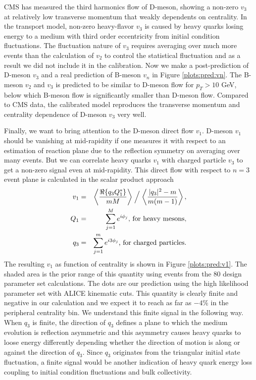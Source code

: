 \documentclass[aps, prc, reprint, amsmath, groupedaddress, nofootinbib]{revtex4-1}
\begin{document}
CMS has measured the third harmonics flow of D-meson, showing a non-zero $v_3$ at relatively low transverse momentum that weakly dependents on centrality.
In the transport model, non-zero heavy-flavor $v_3$ is caused by heavy quarks losing energy to a medium with third order eccentricity from initial condition fluctuations.
The fluctuation nature of $v_3$ requires averaging over much more events than the calculation of $v_2$ to control the statistical fluctuation and as a result we did not include it in the calibration.
Now we make a post-prediction of D-meson $v_3$ and a real prediction of B-meson $v_n$ in Figure \ref{plots:pred:vn}.
The B-meson $v_2$ and $v_3$ is predicted to be similar to D-meson flow for $p_T > 10$ GeV, below which B-meson flow is significantly smaller than D-meson flow.
Compared to CMS data, the calibrated model reproduces the transverse momentum and centrality dependence of D-meson $v_3$ very well.

Finally, we want to bring attention to the D-meson direct flow $v_1$.
D-meson $v_1$ should be vanishing at mid-rapidity if one measures it with respect to an estimation of reaction plane due to the reflection symmetry on averaging over many events.
But we can correlate heavy quarks $v_1$ with charged particle $v_3$ to get a non-zero signal even at mid-rapidity.
This direct flow with respect to $n=3$ event plane is calculated in the scalar product approach
\begin{eqnarray}
v_1 &=& \left\langle \frac{\Re\{q_3 Q_1^*\}}{mM} \right\rangle\Bigm/\left\langle \frac{|q_3|^2-m}{m(m-1)} \right\rangle,\\
Q_1 &=& \sum_{j=1}^{M}e^{i\phi_j} \textrm{, for heavy mesons},\nonumber\\
q_3 &=& \sum_{j=1}^{m}e^{i3\phi_j} \textrm{, for charged particles}. \nonumber
\end{eqnarray}
The resulting $v_1$ as function of centrality is shown in Figure \ref{plots:pred:v1}.
The shaded area is the prior range of this quantity using events from the 80 design parameter set calculations.
The dots are our prediction using the high likelihood parameter set with ALICE kinematic cuts.
This quantity is clearly finite and negative in our calculation and we expect it to reach as far as $-4\%$ in the peripheral centrality bin.
We understand this finite signal in the following way. 
When $q_3$ is finite, the direction of $q_3$ defines a plane to which the medium evolution is reflection asymmetric and this asymmetry causes heavy quarks to loose energy differently depending whether the direction of motion is along or against the direction of $q_3$.
Since $q_3$ originates from the triangular initial state fluctuation, a finite signal would be another indication of heavy quark energy loss coupling to initial condition fluctuations and bulk collectivity.
\end{document}

